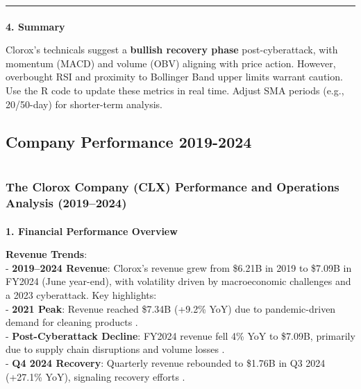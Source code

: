 \documentclass[
  letterpaper,
  DIV=11,
  numbers=noendperiod]{scrartcl}
\makeatletter
\let\oldparagraph\paragraph
\renewcommand{\paragraph}{
    \@ifstar
      \xxxParagraphStar
      \xxxParagraphNoStar
  }
\newcommand{\xxxParagraphStar}[1]{\oldparagraph*{#1}\mbox{}}
\newcommand{\xxxParagraphNoStar}[1]{\oldparagraph{#1}\mbox{}}
\makeatother
\begin{document}
\begin{center}\rule{0.5\linewidth}{0.5pt}\end{center}

\paragraph{\texorpdfstring{\textbf{4.
Summary}}{4. Summary}}\label{summary}

Clorox's technicals suggest a \textbf{bullish recovery phase}
post-cyberattack, with momentum (MACD) and volume (OBV) aligning with
price action. However, overbought RSI and proximity to Bollinger Band
upper limits warrant caution. Use the R code to update these metrics in
real time. Adjust SMA periods (e.g., 20/50-day) for shorter-term
analysis.

\subsection{Company Performance
2019-2024}\label{company-performance-2019-2024}

\section{}\label{section-5}

\subsubsection{The Clorox Company (CLX) Performance and Operations
Analysis
(2019--2024)}\label{the-clorox-company-clx-performance-and-operations-analysis-20192024}

\paragraph{\texorpdfstring{\textbf{1. Financial Performance
Overview}}{1. Financial Performance Overview}}\label{financial-performance-overview}

\textbf{Revenue Trends}:\\
- \textbf{2019--2024 Revenue}: Clorox's revenue grew from \$6.21B in
2019 to \$7.09B in FY2024 (June year-end), with volatility driven by
macroeconomic challenges and a 2023 cyberattack. Key highlights:\\
- \textbf{2021 Peak}: Revenue reached \$7.34B (+9.2\% YoY) due to
pandemic-driven demand for cleaning products .\\
- \textbf{Post-Cyberattack Decline}: FY2024 revenue fell 4\% YoY to
\$7.09B, primarily due to supply chain disruptions and volume losses .\\
- \textbf{Q4 2024 Recovery}: Quarterly revenue rebounded to \$1.76B in
Q3 2024 (+27.1\% YoY), signaling recovery efforts .
\end{document}

